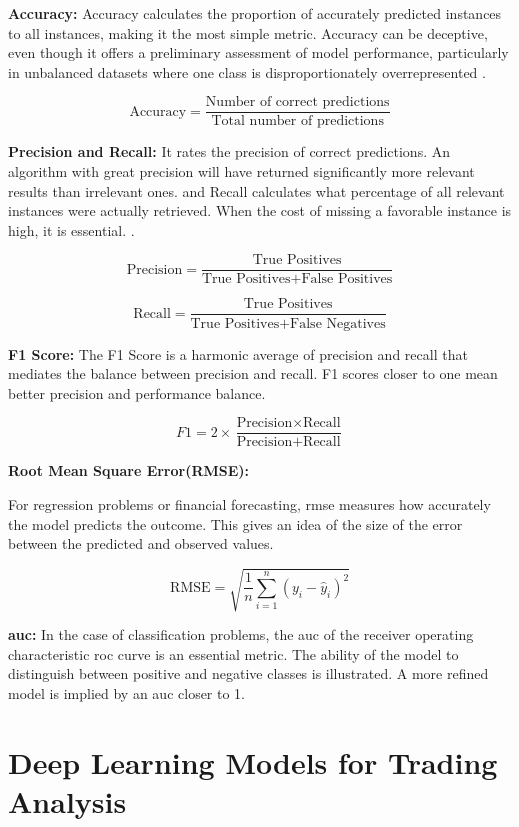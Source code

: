\textbf{Accuracy:}   Accuracy calculates the proportion of accurately predicted instances to all instances, making it the most simple metric. Accuracy can be deceptive, even though it offers a preliminary assessment of model performance, particularly in unbalanced datasets where one class is disproportionately overrepresented  \citep{M2015ARO}.

\[ \text{Accuracy} = \frac{\text{Number of correct predictions}}{\text{Total number of predictions}} \]

\textbf{Precision and Recall:} It rates the precision of correct predictions. An algorithm with great precision will have returned significantly more relevant results than irrelevant ones. and Recall calculates what percentage of all relevant instances were actually retrieved. When the cost of missing a favorable instance is high, it is essential.
 \citep{DBLP:journals/corr/abs-2010-16061}.

\[ \text{Precision} = \frac{\text{True Positives}}{\text{True Positives} + \text{False Positives}} \]

\[ \text{Recall} = \frac{\text{True Positives}}{\text{True Positives} + \text{False Negatives}} \]

\textbf{F1 Score:} The F1 Score is a harmonic average of precision and recall that mediates the balance between precision and recall. F1 scores closer to one mean better precision and performance balance\citep{DBLP:journals/ipm/SokolovaL09}.

\[ F1 = 2 \times \frac{\text{Precision} \times \text{Recall}}{\text{Precision} + \text{Recall}} \]


\textbf{Root Mean Square Error(RMSE):}

For regression problems or financial forecasting, \gls{rmse} measures how accurately the model predicts the outcome. This gives an idea of the size of the error between the predicted and observed values.

\[ \text{RMSE} = \sqrt{\frac{1}{n} \sum_{i=1}^{n} (y_i - \hat{y}_i)^2} \]

\textbf{\gls{auc}:}
 In the case of classification problems, the \gls{auc} of the receiver operating characteristic \gls{roc} curve is an essential metric. The ability of the model to distinguish between positive and negative classes is illustrated. A more refined model is implied by an \gls{auc} closer to 1.

\goodbreak
\section{Deep Learning Models for Trading Analysis}
\smallskip

